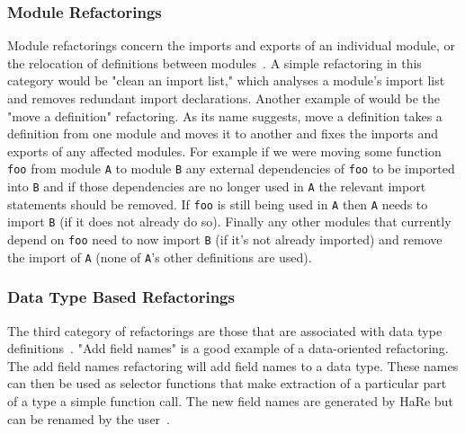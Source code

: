 \subsubsection{Module Refactorings}

Module refactorings concern the imports and exports of an individual module, or the relocation of definitions between modules~\DIFdelbegin {}\DIFdelend \DIFaddbegin {}\DIFaddend . A simple refactoring in this category would be "clean an import list," which analyses a module's import list and removes redundant import declarations. Another example of \DIFdelbegin {}\DIFdelend \DIFaddbegin {}\DIFaddend would be the "move a definition" refactoring. As its name suggests, move a definition takes a definition from one module and moves it to another and fixes the imports and exports of any affected modules. For example if we were moving some function \texttt{foo} from module \texttt{A} to module \texttt{B} any external dependencies of \texttt{foo} \DIFdelbegin {}\DIFdelend \DIFaddbegin {}\DIFaddend to be imported into \texttt{B} and if those dependencies are no longer used in \texttt{A} \DIFaddbegin {}\DIFaddend the relevant import statements should be removed. If \texttt{foo} is still being used in \texttt{A} then \texttt{A} needs to import \texttt{B} (if it does not already do so). Finally any other modules that currently depend on \texttt{foo} need to now import \texttt{B} (if it's not already imported) and remove the import of \texttt{A} (\DIFdelbegin {}\DIFdelend \DIFaddbegin {}\DIFaddend none of \texttt{A}'s other definitions are used).

\subsubsection{Data Type Based Refactorings}

The third category of refactorings are those that are associated with data type definitions~\DIFdelbegin {}\DIFdelend \DIFaddbegin {}\DIFaddend . "Add field names" is a good example of a data-oriented refactoring.  The add field names refactoring will add field names to a data type. These names can then be used as selector functions that make extraction of a particular part of a type a simple function call. The new field names are generated by HaRe but can be renamed by the user~\citep{huiqingThesis}.

